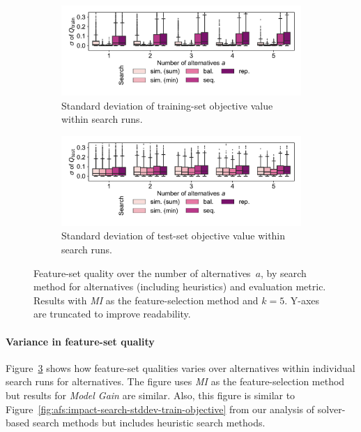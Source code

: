 \documentclass{article}
\theoremstyle{definition}
\begin{document}
\begin{figure}[t]
	\centering
	\begin{subfigure}[t]{\textwidth}
		\centering
		\includegraphics[width=\textwidth, trim=15 25 15 15, clip]{plots/afs-impact-search-heuristics-stddev-train-objective.pdf}
		\caption{Standard deviation of training-set objective value within search runs.}
		\label{fig:afs:impact-search-heuristics-stddev-train-objective}
	\end{subfigure}
	\begin{subfigure}[t]{\textwidth}
		\centering
		\includegraphics[width=\textwidth, trim=15 25 15 15, clip]{plots/afs-impact-search-heuristics-stddev-test-objective.pdf}
		\caption{Standard deviation of test-set objective value within search runs.}
		\label{fig:afs:impact-search-heuristics-stddev-test-objective}
	\end{subfigure}
	\caption{
		Feature-set quality over the number of alternatives~$a$, by search method for alternatives (including heuristics) and evaluation metric.
		Results with \emph{MI} as the feature-selection method and $k=5$.
		Y-axes are truncated to improve readability.
	}
	\label{fig:afs:impact-search-heuristics-stddev}
\end{figure}

\paragraph{Variance in feature-set quality}

Figure~\ref{fig:afs:impact-search-heuristics-stddev} shows how feature-set qualities varies over alternatives within individual search runs for alternatives.
The figure uses \emph{MI} as the feature-selection method but results for \emph{Model Gain} are similar.
Also, this figure is similar to Figure~\ref{fig:afs:impact-search-stddev-train-objective} from our analysis of solver-based search methods but includes heuristic search methods.
\end{document}
